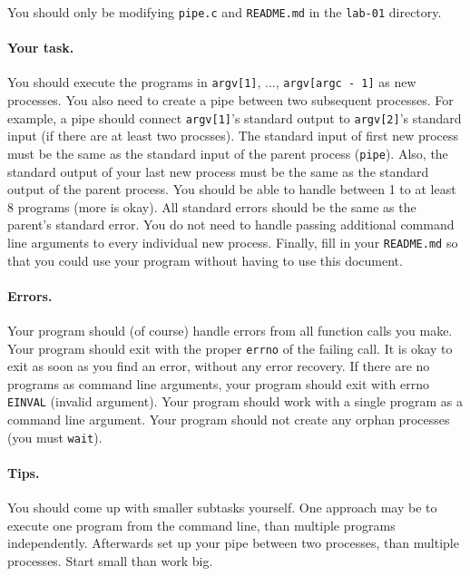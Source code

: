 You should only be modifying \texttt{pipe.c} and \texttt{README.md} in the
\texttt{lab-01} directory.

\paragraph{Your task.}

You should execute the programs in \texttt{argv[1]}, ...,
\texttt{argv[argc - 1]} as new processes.
You also need to create a pipe between two subsequent processes.
For example, a pipe should connect \texttt{argv[1]}'s standard output to
\texttt{argv[2]}'s standard input (if there are at least two procsses).
The standard input of first new process must be the same as the standard input
of the parent process (\texttt{pipe}).
Also, the standard output of your last new process must be the same as the
standard output of the parent process.
You should be able to handle between 1 to at least 8 programs (more is okay).
All standard errors should be the same as the parent's standard error.
You do not need to handle passing additional command line arguments to every
individual new process.
Finally, fill in your \texttt{README.md} so that you could use your program
without having to use this document.

\paragraph{Errors.}

Your program should (of course) handle errors from all function calls you make.
Your program should exit with the proper \texttt{errno} of the failing call.
It is okay to exit as soon as you find an error, without any error recovery.
If there are no programs as command line arguments, your program should exit
with errno \texttt{EINVAL} (invalid argument).
Your program should work with a single program as a command line argument.
Your program should not create any orphan processes (you must \texttt{wait}).

\paragraph{Tips.}

You should come up with smaller subtasks yourself.
One approach may be to execute one program from the command line, than multiple
programs independently. Afterwards set up your pipe between two processes, than
multiple processes.
Start small than work big.

